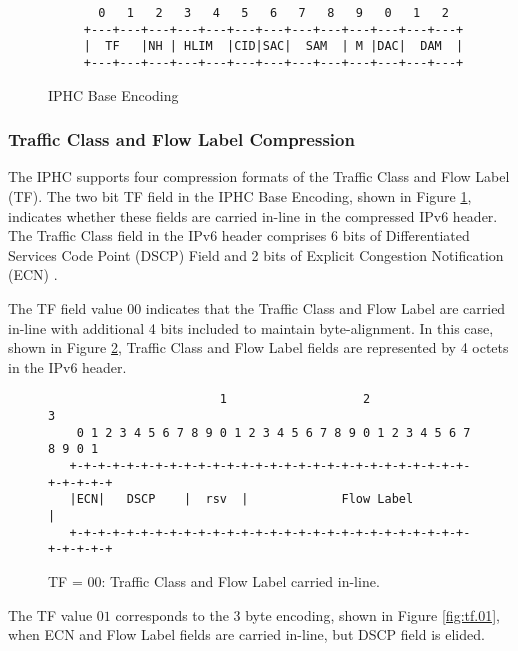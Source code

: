 \documentclass[12pt, titlepage, a4paper]{report}
\newenvironment{mylisting}
{\begin{list}{}{\setlength{\leftmargin}{1em}}\item\footnotesize}
{\end{list}}
\begin{document}
\begin{figure}[htp]
\begin{mylisting}
\begin{verbatim}
       0   1   2   3   4   5   6   7   8   9   0   1   2
     +---+---+---+---+---+---+---+---+---+---+---+---+---+
     |  TF   |NH | HLIM  |CID|SAC|  SAM  | M |DAC|  DAM  |
     +---+---+---+---+---+---+---+---+---+---+---+---+---+
\end{verbatim}
\end{mylisting}
\caption{IPHC Base Encoding}\label{fig:iphc.format}
\end{figure}

\subsubsection{Traffic Class and  Flow Label Compression}
The IPHC supports four compression formats of the Traffic Class and Flow Label (TF). The two bit TF field in the IPHC Base Encoding, shown in Figure \ref{fig:iphc.format}, indicates whether these fields are carried in-line in the compressed IPv6 header. The Traffic Class field in the IPv6 header comprises 6 bits of Differentiated Services Code Point (DSCP) Field \cite{rfc2474} and 2 bits of Explicit Congestion Notification (ECN) \cite{rfc3168}.

The TF field value $00$ indicates that the Traffic Class and Flow Label are carried in-line with additional 4 bits included to maintain byte-alignment. In this case, shown in Figure \ref{fig:tf.00}, Traffic Class and  Flow Label fields are represented by 4 octets in the IPv6 header.
\begin{figure}[htp]
\begin{mylisting}
\begin{verbatim}
                        1                   2                   3
    0 1 2 3 4 5 6 7 8 9 0 1 2 3 4 5 6 7 8 9 0 1 2 3 4 5 6 7 8 9 0 1
   +-+-+-+-+-+-+-+-+-+-+-+-+-+-+-+-+-+-+-+-+-+-+-+-+-+-+-+-+-+-+-+-+
   |ECN|   DSCP    |  rsv  |             Flow Label                |
   +-+-+-+-+-+-+-+-+-+-+-+-+-+-+-+-+-+-+-+-+-+-+-+-+-+-+-+-+-+-+-+-+
\end{verbatim}
\end{mylisting}
\caption{ TF = 00: Traffic Class and Flow Label carried in-line.}\label{fig:tf.00}
\end{figure}

The TF value $01$ corresponds to the 3 byte encoding, shown in Figure \ref{fig:tf.01}, when ECN and Flow Label fields are carried in-line, but DSCP field is elided.
\end{document}

